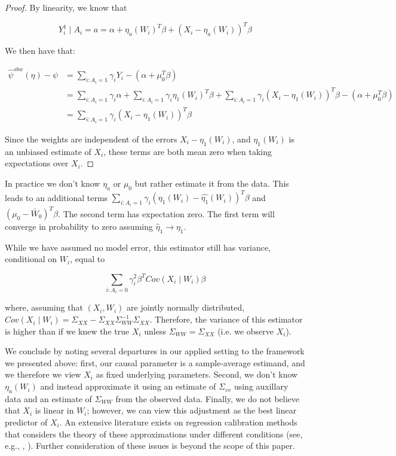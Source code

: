 \begin{proof}
By linearity, we know that

$$
Y_i^1 \mid A_i = a = \alpha + \eta_a(W_i)^T\beta + (X_i - \eta_a(W_i))^T\beta
$$

We then have that:

\begin{align*}
    \hat{\psi}^{sbw}(\eta) - \psi &= \sum_{i: A_i = 1}\gamma_iY_i - (\alpha + \mu_0^T\beta) \\
    &= \sum_{i: A_i = 1}\gamma_i\alpha + \sum_{i: A_i = 1}\gamma_i\eta_1(W_i)^T\beta + \sum_{i: A_i = 1}\gamma_i(X_i - \eta_1(W_i))^T\beta - (\alpha + \mu_0^T\beta) \\
    &= \sum_{i: A_i = 1}\gamma_i(X_i - \eta_1(W_i))^T\beta
\end{align*}

Since the weights are independent of the errors $X_i - \eta_1(W_i)$, and $\eta_1(W_i)$ is an unbiased estimate of $X_i$, these terms are both mean zero when taking expectations over $X_i$. 
\end{proof}

\begin{remark}
In practice we don't know $\eta_a$ or $\mu_0$ but rather estimate it from the data. This leads to an additional terms $\sum_{i: A_i = 1}\gamma_i(\eta_1(W_i) - \hat{\eta_1}(W_i))^T\beta$ and $(\mu_0 - \bar{W}_0)^T\beta$. The second term has expectation zero. The first term will converge in probability to zero assuming $\hat{\eta}_1 \to \eta_1$.
\end{remark}

\begin{remark}
While we have assumed no model error, this estimator still has variance, conditional on $W_i$, equal to

$$
\sum_{i: A_i = 0} \gamma_i^2\beta^TCov(X_i \mid W_i)\beta
$$

where, assuming that $(X_i, W_i)$ are jointly normally distributed, $Cov(X_i \mid W_i) = \Sigma_{XX} - \Sigma_{XX}\Sigma_{WW}^{-1}\Sigma_{XX}$. Therefore, the variance of this estimator is higher than if we knew the true $X_i$ unless $\Sigma_{WW} = \Sigma_{XX}$ (i.e. we observe $X_i$). 
\end{remark}

We conclude by noting several departures in our applied setting to the framework we presented above: first, our causal parameter is a sample-average estimand, and we therefore we view $X_i$ as fixed underlying parameters. Second, we don't know $\eta_a(W_i)$ and instead approximate it using an estimate of $\Sigma_{vv}$ using auxillary data and an estimate of $\Sigma_{WW}$ from the observed data. Finally, we do not believe that $X_i$ is linear in $W_i$; however, we can view this adjustment as the best linear predictor of $X_i$. An extensive literature exists on regression calibration methods that considers the theory of these approximations under different conditions (see, e.g., \cite{gleser1992importance}, \cite{carroll2006measurement}). Further consideration of these issues is beyond the scope of this paper.

